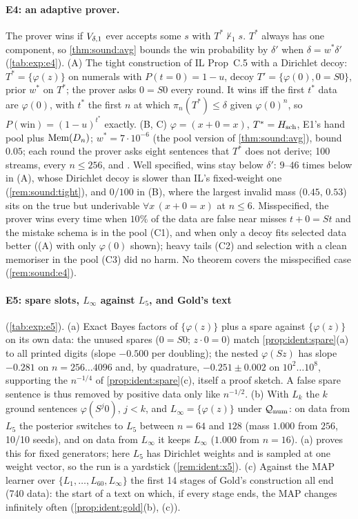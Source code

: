 \paragraph{E4: an adaptive prover.}
The prover wins if $V_{\delta,1}$ ever accepts some $s$ with $T^*\nvdash_1s$. $T^*$ always has one component, so \cref{thm:sound:avg} bounds the win probability by $\delta'$ when $\delta=w^*\delta'$ (\cref{tab:exp:e4}).
(A) The tight construction of IL Prop~C.5 \citep{claude2026whatfollows} with a Dirichlet decoy: $T^*=\{\varphi(z)\}$ on numerals with $P(t=0)=1-u$, decoy $T'=\{\varphi(0),0=S0\}$, prior $w^*$ on $T^*$; the prover asks $0=S0$ every round. It wins iff the first $t^*$ data are $\varphi(0)$, with $t^*$ the first $n$ at which $\pi_n(T^*)\le\delta$ given $\varphi(0)^n$, so $P(\text{win})=(1-u)^{t^*}$ exactly.
(B, C) $\varphi=(x+0=x)$, $T^*=H_{\mathrm{sch}}$, E1's hand pool plus $\mathrm{Mem}(D_n)$; $w^*=7\cdot10^{-6}$ (the pool version of \cref{thm:sound:avg}), bound $0.05$; each round the prover asks eight sentences that $T^*$ does not derive; 100 streams, every $n\le256$, \Lzero{} and \Lone.
Well specified, wins stay below $\delta'$: $9$--$46$ times below in (A), whose Dirichlet decoy is slower than IL's fixed-weight one (\cref{rem:sound:tight}), and $0/100$ in (B), where the largest invalid mass ($0.45$, $0.53$) sits on the true but underivable $\forall x\,(x+0=x)$ at $n\le6$. Misspecified, the prover wins every time when $10\%$ of the data are false near misses $t+0=St$ and the mistake schema is in the pool (C1), and when only a decoy fits selected data better ((A) with only $\varphi(0)$ shown); heavy tails (C2) and selection with a clean memoriser in the pool (C3) did no harm. No theorem covers the misspecified case (\cref{rem:sound:e4}).

\paragraph{E5: spare slots, $L_\infty$ against $L_5$, and Gold's text} (\cref{tab:exp:e5}).
(a) Exact Bayes factors of $\{\varphi(z)\}$ plus a spare against $\{\varphi(z)\}$ on its own \Lzero{} data: the unused spares ($0=S0$; $z\cdot0=0$) match \cref{prop:ident:spare}(a) to all printed digits (slope $-0.500$ per doubling); the nested $\varphi(Sz)$ has slope $-0.281$ on $n=256\ldots4096$ and, by quadrature, $-0.251\pm0.002$ on $10^2\ldots10^8$, supporting the $n^{-1/4}$ of \cref{prop:ident:spare}(c), itself a proof sketch. A false spare sentence is thus removed by positive data only like $n^{-1/2}$.
(b) With $L_k$ the $k$ ground sentences $\varphi(S^j0)$, $j<k$, and $L_\infty=\{\varphi(z)\}$ under $\mathcal{Q}_{\mathrm{num}}$: on data from $L_5$ the posterior switches to $L_5$ between $n=64$ and $128$ (mass $1.000$ from $256$, 10/10 seeds), and on data from $L_\infty$ it keeps $L_\infty$ ($1.000$ from $n=16$). (a) proves this for fixed generators; here $L_5$ has Dirichlet weights and is sampled at one weight vector, so the run is a yardstick (\cref{rem:ident:x5}). (c) Against the MAP learner over $\{L_1,\dots,L_{60},L_\infty\}$ the first 14 stages of Gold's construction all end (740 data): the start of a text on which, if every stage ends, the MAP changes infinitely often (\cref{prop:ident:gold}(b), (c)).

